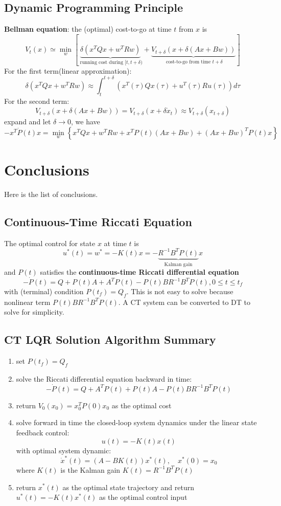 \documentclass[10pt,a4paper,oneside]{article}
\begin{document}
\subsection{Dynamic Programming Principle}
\textbf{Bellman equation}: the (optimal) cost-to-go at time $t$ from $x$ is
\[
V_{t}(x) \simeq \min _{w}\left[\underbrace{\delta\left(x^{T} Q x+w^{T} R w\right)}_{\text { running cost during }[t, t+\delta)}+\underbrace{V_{t+\delta}(x+\delta(A x+B w))}_{\text { cost-to-go from time } t+\delta}\right]
\]
For the first term(linear approximation):
\[
\delta\left(x^{T} Q x+w^{T} R w\right) \approx \int_{t}^{t+ \delta} \left(x^{T} (\tau) Q x(\tau)+u^{T}(\tau) R u(\tau)\right) d \tau
\]
For the second term:
\[
V_{t+\delta}(x+\delta(A x+B w)) = V_{t+\delta}(x+\delta \dot{x}_t) \approx V_{t+\delta}(x_{t+\delta})
\]
expand and let $\delta \rightarrow 0$, we have
\[
-x^{T} \dot{P}(t) x=\min _{w}\left\{x^{T} Q x+w^{T} R w+x^{T} P(t)(A x+B w)+(A x+B w)^{T} P(t) x\right\}
\]

\section{Conclusions}
Here is the list of conclusions.

\subsection{Continuous-Time Riccati Equation}
The optimal control for state $x$ at time $t$ is
\[
u^{*}(t)=w^{*}=-K(t) x=
-\underbrace{R^{-1} B^{T} P(t)}_{\text { Kalman gain }} x
\]
and $P(t)$ satisfies the {\bfseries continuous-time Riccati differential equation}
$$
-\dot{P}(t)=Q+P(t) A+A^{T} P(t)-P(t) B R^{-1} B^{T} P(t), 0 \leq t \leq t_{f}
$$
with (terminal) condition $P(t_f)=Q_f$. This is not easy to solve because nonlinear term $P(t) B R^{-1} B^{T} P(t)$. A CT system can be converted to DT to solve for simplicity.

\subsection{CT LQR Solution Algorithm Summary}

\begin{enumerate}
\item set $P(t_f)=Q_f$
\item solve the Riccati differential equation backward in time:
\[
-\dot{P}(t)=Q + A^{T} P(t) + P(t) A - P(t) B R^{-1} B^{T} P(t)
\]
\item return $V_0(x_0)=x_0^TP(0)x_0$ as the optimal cost
\item solve forward in time the closed-loop system dynamics under the linear state feedback control:
\[
u(t)=-K(t)x(t)
\]
with optimal system dynamic:
\[
\dot{x}^{*}(t)=(A-B K(t)) x^{*}(t), \quad x^{*}(0)=x_{0}
\]
where $K(t)$ is the Kalman gain $K(t)=R^{-1}B^T P(t)$
\item return $x^*(t)$ as the optimal state trajectory and return $u^*(t)=-K(t)x^*(t)$ as the optimal control input
\end{enumerate}
\end{document}
